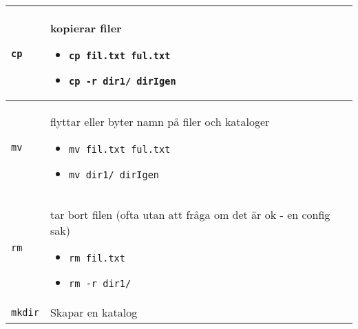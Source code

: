\documentclass[a4paper]{article}
\begin{document}
\begin{longtable}{l|l}
  \midrule
  \begin{minipage}[t]{0.2\textwidth} 
    \texttt{cp}
  \end{minipage}
  &
  \begin{minipage}[t]{0.8\textwidth} 
kopierar filer

\begin{itemize}

\item
  \texttt{cp fil.txt ful.txt}
\item
  \texttt{cp -r dir1/ dirIgen}
\end{itemize}
  \end{minipage}
  \\
  \midrule
  \begin{minipage}[t]{0.2\textwidth} 
    \texttt{mv}
  \end{minipage}
  &
  \begin{minipage}[t]{0.8\textwidth} 
flyttar eller byter namn på filer och kataloger

\begin{itemize}

\item
  \texttt{mv fil.txt ful.txt}
\item
  \texttt{mv dir1/ dirIgen}
\end{itemize}
  \end{minipage}
  \\
  \midrule
  \begin{minipage}[t]{0.2\textwidth} 
    \texttt{rm}
  \end{minipage}
  &
  \begin{minipage}[t]{0.8\textwidth} 
tar bort filen (ofta utan att fr{\aa}ga om det \"ar ok - en config sak)

\begin{itemize}

\item
  \texttt{rm fil.txt}
\item
  \texttt{rm -r dir1/}
\end{itemize}

  \end{minipage}
  \\
  \midrule
  \begin{minipage}[t]{0.2\textwidth} 
    \texttt{mkdir}
  \end{minipage}
  &
  \begin{minipage}[t]{0.8\textwidth} 
Skapar en katalog


\end{minipage}
\end{longtable}
\end{document}
